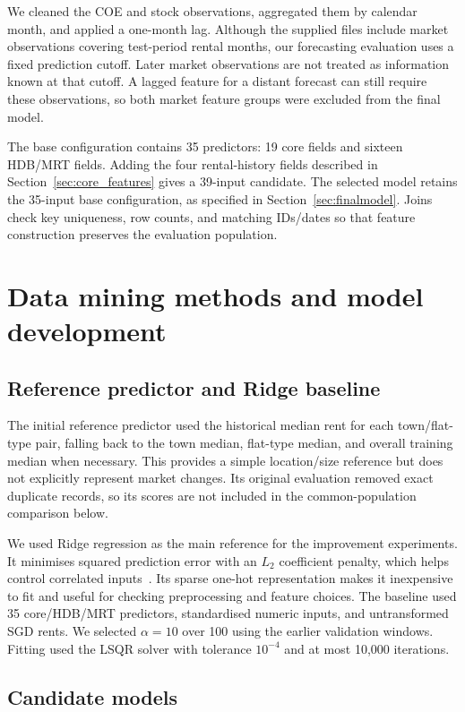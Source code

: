 \documentclass[conference]{IEEEtran}
\begin{document}
We cleaned the COE and stock observations, aggregated them by calendar month,
and applied a one-month lag. Although the supplied files include market
observations covering test-period rental months, our forecasting evaluation
uses a fixed prediction cutoff. Later market observations are not treated
as information known at that cutoff. A lagged feature for a distant forecast
can still require these observations, so both market feature groups were
excluded from the final model.

The base configuration contains 35 predictors: 19 core fields and sixteen
HDB/MRT fields. Adding the four rental-history fields described in
Section~\ref{sec:core_features} gives a 39-input candidate. The selected model
retains the 35-input base configuration, as specified in
Section~\ref{sec:finalmodel}. Joins check key uniqueness, row counts, and
matching IDs/dates so that feature construction preserves the evaluation
population.

\section{Data mining methods and model development}
\label{sec:methods}

\subsection{Reference predictor and Ridge baseline}
The initial reference predictor used the historical median rent
for each town/flat-type pair, falling back to the town median, flat-type
median, and overall training median when necessary. This provides a simple
location/size reference but does not explicitly represent market changes.
Its original evaluation removed exact duplicate records, so its scores are
not included in the common-population comparison below.

We used Ridge regression as the main reference for the improvement experiments.
It minimises squared prediction error with an $L_2$ coefficient penalty,
which helps control correlated inputs~\cite{ridge_reference}. Its sparse
one-hot representation makes it inexpensive to fit and useful for checking
preprocessing and feature choices. The baseline used 35 core/HDB/MRT
predictors, standardised numeric inputs, and untransformed SGD rents. We
selected $\alpha=10$ over 100 using the earlier validation windows. Fitting
used the LSQR solver with tolerance $10^{-4}$ and at most 10,000 iterations.

\subsection{Candidate models}
\end{document}
